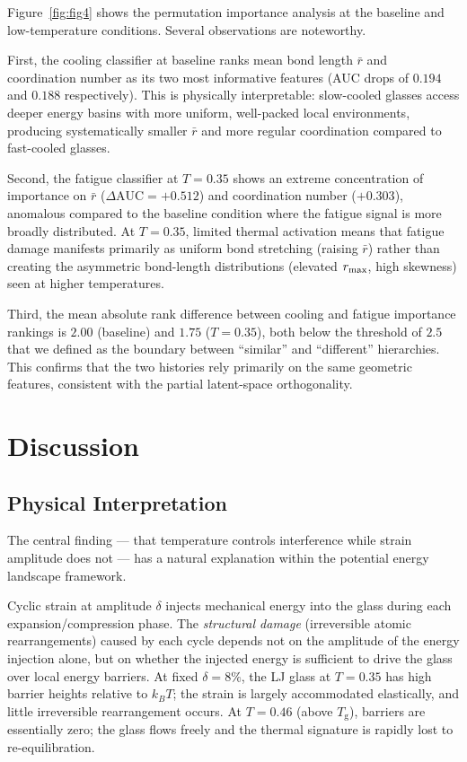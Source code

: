 \documentclass[12pt,a4paper]{article}
\newcommand{\Tg}{T_{\mathrm{g}}}
\begin{document}
Figure~\ref{fig:fig4} shows the permutation importance analysis at the baseline and low-temperature conditions.
Several observations are noteworthy.

First, the cooling classifier at baseline ranks mean bond length $\bar{r}$ and coordination number as its two most informative features (AUC drops of $0.194$ and $0.188$ respectively).
This is physically interpretable: slow-cooled glasses access deeper energy basins with more uniform, well-packed local environments, producing systematically smaller $\bar{r}$ and more regular coordination compared to fast-cooled glasses.

Second, the fatigue classifier at $T = 0.35$ shows an extreme concentration of importance on $\bar{r}$ ($\Delta\text{AUC} = +0.512$) and coordination number ($+0.303$), anomalous compared to the baseline condition where the fatigue signal is more broadly distributed.
At $T = 0.35$, limited thermal activation means that fatigue damage manifests primarily as uniform bond stretching (raising $\bar{r}$) rather than creating the asymmetric bond-length distributions (elevated $r_{\rm max}$, high skewness) seen at higher temperatures.

Third, the mean absolute rank difference between cooling and fatigue importance rankings is $2.00$ (baseline) and $1.75$ ($T = 0.35$), both below the threshold of $2.5$ that we defined as the boundary between ``similar'' and ``different'' hierarchies.
This confirms that the two histories rely primarily on the same geometric features, consistent with the partial latent-space orthogonality.

\section{Discussion}
\label{sec:discussion}

\subsection{Physical Interpretation}
\label{sec:physics}

The central finding — that temperature controls interference while strain amplitude does not — has a natural explanation within the potential energy landscape framework.

Cyclic strain at amplitude $\delta$ injects mechanical energy into the glass during each expansion/compression phase.
The \emph{structural damage} (irreversible atomic rearrangements) caused by each cycle depends not on the amplitude of the energy injection alone, but on whether the injected energy is sufficient to drive the glass over local energy barriers.
At fixed $\delta = 8\%$, the LJ glass at $T = 0.35$ has high barrier heights relative to $k_B T$; the strain is largely accommodated elastically, and little irreversible rearrangement occurs.
At $T = 0.46$ (above $\Tg$), barriers are essentially zero; the glass flows freely and the thermal signature is rapidly lost to re-equilibration.
\end{document}

